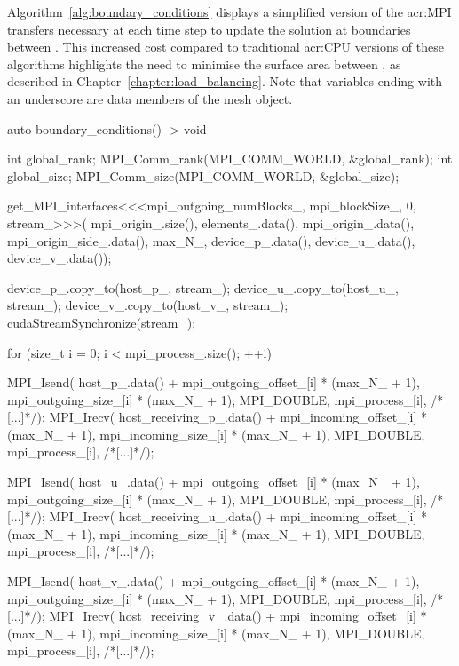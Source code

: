 Algorithm~\ref{alg:boundary_conditions} displays a simplified version of the \acrshort{acr:MPI}
transfers necessary at each time step to update the solution at boundaries between
. This increased cost compared to traditional \acrshort{acr:CPU} versions of
these algorithms highlights the need to minimise the surface area between , as
described in Chapter~\ref{chapter:load_balancing}. Note that variables ending with an underscore are
data members of the mesh object.

\begin{algorithm}[H]
    \begin{cuda}
        auto boundary_conditions() -> void {
            int global_rank;
            MPI_Comm_rank(MPI_COMM_WORLD, &global_rank);
            int global_size;
            MPI_Comm_size(MPI_COMM_WORLD, &global_size);

            get_MPI_interfaces<<<mpi_outgoing_numBlocks_, mpi_blockSize_, 0, stream_>>>(
                mpi_origin_.size(), elements_.data(), 
                mpi_origin_.data(), mpi_origin_side_.data(), max_N_, 
                device_p_.data(), device_u_.data(), device_v_.data());

            device_p_.copy_to(host_p_, stream_);
            device_u_.copy_to(host_u_, stream_);
            device_v_.copy_to(host_v_, stream_);
            cudaStreamSynchronize(stream_);
            
            for (size_t i = 0; i < mpi_process_.size(); ++i) {
                MPI_Isend(
                    host_p_.data() + mpi_outgoing_offset_[i] * (max_N_ + 1), 
                    mpi_outgoing_size_[i] * (max_N_ + 1), 
                    MPI_DOUBLE, mpi_process_[i], /*[...]*/);
                MPI_Irecv(
                    host_receiving_p_.data() + mpi_incoming_offset_[i] * (max_N_ + 1), 
                    mpi_incoming_size_[i] * (max_N_ + 1), 
                    MPI_DOUBLE, mpi_process_[i], /*[...]*/);

                MPI_Isend(
                    host_u_.data() + mpi_outgoing_offset_[i] * (max_N_ + 1), 
                    mpi_outgoing_size_[i] * (max_N_ + 1), 
                    MPI_DOUBLE, mpi_process_[i], /*[...]*/);
                MPI_Irecv(
                    host_receiving_u_.data() + mpi_incoming_offset_[i] * (max_N_ + 1), 
                    mpi_incoming_size_[i] * (max_N_ + 1), 
                    MPI_DOUBLE, mpi_process_[i], /*[...]*/);

                MPI_Isend(
                    host_v_.data() + mpi_outgoing_offset_[i] * (max_N_ + 1), 
                    mpi_outgoing_size_[i] * (max_N_ + 1), 
                    MPI_DOUBLE, mpi_process_[i], /*[...]*/);
                MPI_Irecv(
                    host_receiving_v_.data() + mpi_incoming_offset_[i] * (max_N_ + 1), 
                    mpi_incoming_size_[i] * (max_N_ + 1), 
                    MPI_DOUBLE, mpi_process_[i], /*[...]*/);
            }

}
\end{cuda}
\end{algorithm}
